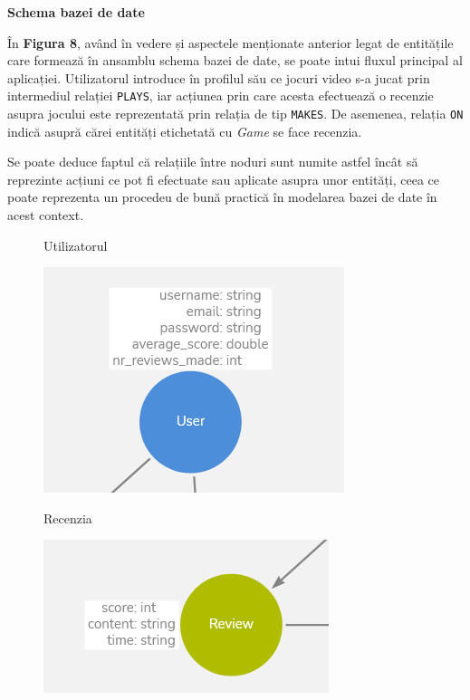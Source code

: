 \documentclass[12pt,a4paper]{report}
\begin{document}
\bigskip
\textbf{Schema bazei de date}
\bigskip

În \textbf{Figura 8}, având în vedere și aspectele menționate anterior legat de entitățile care formează în ansamblu schema bazei de date, se poate intui fluxul principal al aplicației. Utilizatorul introduce în profilul său ce jocuri video s-a jucat prin intermediul relației \texttt{PLAYS}, iar acțiunea prin care acesta efectuează o recenzie asupra jocului este reprezentată prin relația de tip \texttt{MAKES}. De asemenea, relația \texttt{ON} indică asupră cărei entități etichetată cu \emph{Game} se face recenzia.

Se poate deduce faptul că relațiile între noduri sunt numite astfel încât să reprezinte acțiuni ce pot fi efectuate sau aplicate asupra unor entități, ceea ce poate reprezenta un procedeu de bună practică în modelarea bazei de date în acest context. \cite{11}



\begin{figure}[H]
\centering
\caption{Utilizatorul}
\includegraphics[]{exemplu_6_neo4j}
\caption*{}
\end{figure}

\begin{figure}[H]
\centering
\caption{Recenzia}
\includegraphics[]{exemplu_7_neo4j}
\caption*{}
\end{figure}
\end{document}
